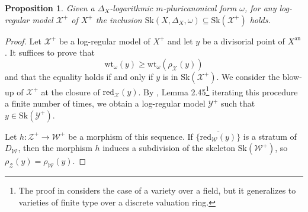 \documentclass{amsart}%
\numberwithin{equation}{subsection}
\theoremstyle{plain2}
\newtheorem{prop}[equation]{Proposition}
\theoremstyle{definition2}
\theoremstyle{stepstyle}
\theoremstyle{point}
\theoremstyle{subpoint}
\newcommand{\cX}{\ensuremath{\mathscr{X}}}
\newcommand{\cY}{\ensuremath{\mathscr{Y}}}
\newcommand{\cZ}{\ensuremath{\mathscr{Z}}}
\newcommand{\cW}{\ensuremath{\mathscr{W}}}
\renewcommand{\cY}{\ensuremath{\mathscr{Y}}}
\newcommand{\redu}{\mathrm{red}}
\newcommand{\an}{\mathrm{an}}
\newcommand{\weight}{\mathrm{wt}}
\newcommand{\Sk}{\mathrm{Sk}}
\begin{document}
\begin{prop} \label{prop KS inside log-reg model}
Given a $\Delta_X$-logarithmic $m$-pluricanonical form $\omega$, for any log-regular model $\cX^+$ of $X^+$ the inclusion $\Sk(X,\Delta_X,\omega) \subseteq \Sk(\cX^+)$ holds.
\end{prop}
\begin{proof}
Let $\cX^+$ be a log-regular model of $X^+$ and let $y$ be a divisorial point of $X^\an$. It suffices to prove that $$\weight_{\omega}(y) \geqslant \weight_{\omega}(\rho_\cX(y))$$ and that the equality holds if and only if $y$ is in $\Sk(\cX^+)$. We consider the blow-up of $\cX^+$ at the closure of $\redu_{\cX}(y)$. By \cite{KollarMori}, Lemma 2.45\footnote{The proof in \cite{KollarMori} considers the case of a variety over a field, but it generalizes to varieties of finite type over a discrete valuation ring.} iterating this procedure a finite number of times, we obtain a log-regular model $\cY^+$ such that $y \in \Sk(\cY^+)$.

Let $h: \cZ^+ \rightarrow \cW^+$ be a morphism of this sequence. If $\overline{ \{\redu_{\cW}(y)\}}$ is a stratum of $D_\cW$, then the morphism $h$ induces a subdivision of the skeleton $\Sk(\cW^+)$, so $\rho_\cZ(y)= \rho_{\cW}(y)$.


\end{proof}
\end{document}

